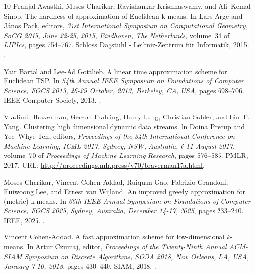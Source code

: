 \documentclass[11pt]{article}
\begin{document}
\begin{thebibliography}{10}
Pranjal Awasthi, Moses Charikar, Ravishankar Krishnaswamy, and Ali~Kemal Sinop.
\newblock The hardness of approximation of {Euclidean} k-means.
\newblock In Lars Arge and J{\'{a}}nos Pach, editors, {\em 31st International
  Symposium on Computational Geometry, SoCG 2015, June 22-25, 2015, Eindhoven,
  The Netherlands}, volume~34 of {\em LIPIcs}, pages 754--767. Schloss Dagstuhl
  - Leibniz-Zentrum f{\"{u}}r Informatik, 2015.
\newblock \href {https://doi.org/10.4230/LIPIcs.SOCG.2015.754}
  {}.

Yair Bartal and Lee{-}Ad Gottlieb.
\newblock A linear time approximation scheme for {Euclidean} {TSP}.
\newblock In {\em 54th Annual {IEEE} Symposium on Foundations of Computer
  Science, {FOCS} 2013, 26-29 October, 2013, Berkeley, CA, {USA}}, pages
  698--706. {IEEE} Computer Society, 2013.
\newblock \href {https://doi.org/10.1109/FOCS.2013.80}
  {}.

Vladimir Braverman, Gereon Frahling, Harry Lang, Christian Sohler, and Lin~F.
  Yang.
\newblock Clustering high dimensional dynamic data streams.
\newblock In Doina Precup and Yee~Whye Teh, editors, {\em Proceedings of the
  34th International Conference on Machine Learning, {ICML} 2017, Sydney, NSW,
  Australia, 6-11 August 2017}, volume~70 of {\em Proceedings of Machine
  Learning Research}, pages 576--585. {PMLR}, 2017.
\newblock URL: \url{http://proceedings.mlr.press/v70/braverman17a.html}.

Moses Charikar, Vincent Cohen{-}Addad, Ruiquan Gao, Fabrizio Grandoni, Euiwoong
  Lee, and Ernest van Wijland.
\newblock An improved greedy approximation for (metric) k-means.
\newblock In {\em 66th {IEEE} Annual Symposium on Foundations of Computer
  Science, {FOCS} 2025, Sydney, Australia, December 14-17, 2025}, pages
  233--240. {IEEE}, 2025.
\newblock \href {https://doi.org/10.1109/FOCS63196.2025.00016}
  {}.

Vincent Cohen{-}Addad.
\newblock A fast approximation scheme for low-dimensional \emph{k}-means.
\newblock In Artur Czumaj, editor, {\em Proceedings of the Twenty-Ninth Annual
  {ACM-SIAM} Symposium on Discrete Algorithms, {SODA} 2018, New Orleans, LA,
  USA, January 7-10, 2018}, pages 430--440. {SIAM}, 2018.
\newblock \href {https://doi.org/10.1137/1.9781611975031.29}
  {}.


\end{thebibliography}
\end{document}
